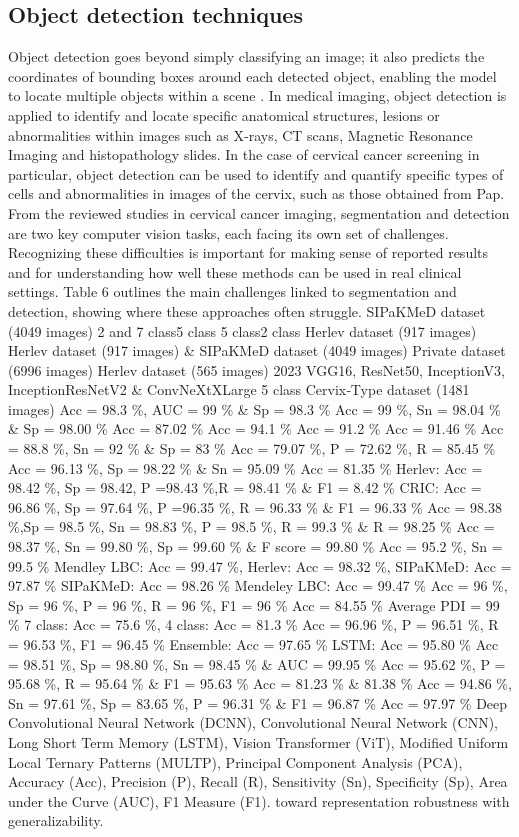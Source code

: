 \documentclass[final,5p,times,twocolumn,authoryear]{elsarticle}
\begin{document}
\subsection{Object detection techniques}
Object detection goes beyond simply classifying an image; it also predicts the coordinates of bounding boxes around each detected object, enabling the model to locate multiple objects within a scene \cite{ref80}. In medical imaging, object detection is applied to identify and locate specific anatomical structures, lesions or abnormalities within images such as X‑rays, CT scans, Magnetic Resonance Imaging and histopathology slides. In the case of cervical cancer screening in particular, object detection can be used to identify and quantify specific types of cells and abnormalities in images of the cervix, such as those obtained from Pap.
From the reviewed studies in cervical cancer imaging, segmentation and detection are two key computer vision tasks, each facing its own set of challenges. Recognizing these difficulties is important for making sense of reported results and for understanding how well these methods can be used in real clinical settings. Table 6 outlines the main challenges linked to segmentation and detection, showing where these approaches often struggle.
SIPaKMeD dataset (4049 images)
2 and 7 class5 class
5 class2 class
Herlev dataset (917 images)
Herlev dataset (917 images) \& SIPaKMeD dataset (4049 images) Private dataset (6996 images) Herlev dataset (565 images)
2023
VGG16, ResNet50, InceptionV3, InceptionResNetV2 \& ConvNeXtXLarge
5 class
Cervix‑Type dataset (1481 images)
Acc = 98.3 \%, AUC = 99 \% \& Sp = 98.3 \%
Acc = 99 \%, Sn = 98.04 \% \& Sp = 98.00 \% Acc = 87.02 \% Acc = 94.1 \% Acc = 91.2 \% Acc = 91.46 \% Acc = 88.8 \%, Sn = 92 \% \& Sp = 83 \% Acc = 79.07 \%, P = 72.62 \%, R = 85.45 \% Acc = 96.13 \%, Sp = 98.22 \% \& Sn = 95.09 \% Acc = 81.35 \% Herlev: Acc = 98.42 \%, Sp = 98.42, P =98.43 \%,R = 98.41 \% \& F1 = 8.42 \% CRIC: Acc = 96.86 \%, Sp = 97.64 \%, P =96.35 \%, R = 96.33 \% \& F1 = 96.33 \% Acc = 98.38 \%,Sp = 98.5 \%, Sn = 98.83 \%, P = 98.5 \%, R = 99.3 \% \& R = 98.25 \% Acc = 98.37 \%, Sn = 99.80 \%, Sp = 99.60 \% \& F score = 99.80 \% Acc = 95.2 \%, Sn = 99.5 \% Mendley LBC: Acc = 99.47 \%, Herlev: Acc = 98.32 \%, SIPaKMeD: Acc = 97.87 \%
SIPaKMeD: Acc = 98.26 \% Mendeley LBC: Acc = 99.47 \% Acc = 96 \%, Sp = 96 \%, P = 96 \%, R = 96 \%, F1 = 96 \% Acc = 84.55 \% Average PDI = 99 \% 7 class: Acc = 75.6 \%, 4 class: Acc = 81.3 \% Acc = 96.96 \%, P = 96.51 \%, R = 96.53 \%, F1 = 96.45 \% Ensemble: Acc = 97.65 \% LSTM: Acc = 95.80 \% Acc = 98.51 \%, Sp = 98.80 \%, Sn = 98.45 \% \& AUC = 99.95 \% Acc = 95.62 \%, P = 95.68 \%, R = 95.64 \% \& F1 = 95.63 \% Acc = 81.23 \% \& 81.38 \% Acc = 94.86 \%, Sn = 97.61 \%, Sp = 83.65 \%, P = 96.31 \% \& F1 = 96.87 \% Acc = 97.97 \%
Deep Convolutional Neural Network (DCNN), Convolutional Neural Network (CNN), Long Short Term Memory (LSTM), Vision Transformer (ViT), Modified Uniform Local Ternary Patterns (MULTP), Principal Component Analysis (PCA), Accuracy (Acc), Precision (P), Recall (R), Sensitivity (Sn), Specificity (Sp), Area under the Curve (AUC), F1 Measure (F1).
toward representation robustness with generalizability.
\end{document}
